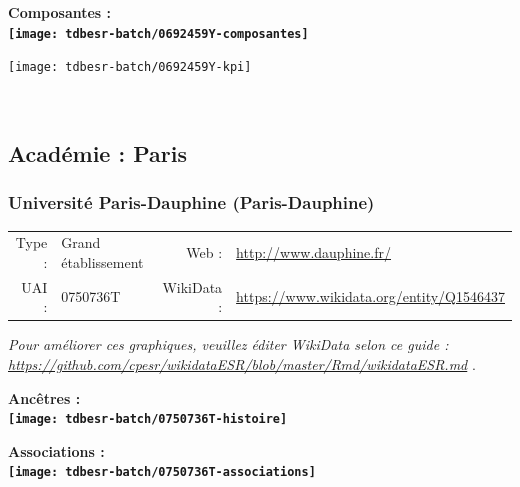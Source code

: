 \documentclass[12pt,french,]{article}
\begin{document}
\hrulefill

\begin{center} \bf Composantes : \\  
\texttt{[image: tdbesr-batch/0692459Y-composantes]} \end{center}

\begin{center}\texttt{[image: tdbesr-batch/0692459Y-kpi]} \end{center}\checkoddpage

\ifoddpage \fi ~\newpage  

\hypertarget{acaduxe9mie-paris-1}{%
\subsection{Académie : Paris}\label{acaduxe9mie-paris-1}}

\hypertarget{universituxe9-paris-dauphine-paris-dauphine}{%
\subsubsection{Université Paris-Dauphine
(Paris-Dauphine)}\label{universituxe9-paris-dauphine-paris-dauphine}}

\begin{tabular*}{\textwidth}{rp{5cm}rl}  
\hline  
Type : & Grand établissement & Web : &\href{http://www.dauphine.fr/}{http://www.dauphine.fr/} \\  
UAI : & 0750736T & WikiData : & \href{https://www.wikidata.org/entity/Q1546437}{https://www.wikidata.org/entity/Q1546437} \\  
\hline  
\end{tabular*}

\textit{\scriptsize Pour améliorer ces graphiques, veuillez éditer WikiData selon ce guide :  \href{https://github.com/cpesr/wikidataESR/blob/master/Rmd/wikidataESR.md}{https://github.com/cpesr/wikidataESR/blob/master/Rmd/wikidataESR.md}}
.

\vspace{1cm}  
\begin{minipage}[b]{0.50\textwidth}\begin{center} \bf Ancêtres : \\  
\texttt{[image: tdbesr-batch/0750736T-histoire]} \end{center}\end{minipage}\begin{minipage}[b]{0.50\textwidth}\begin{center} \bf Associations : \\  
\texttt{[image: tdbesr-batch/0750736T-associations]} \end{center}\end{minipage}
\end{document}
